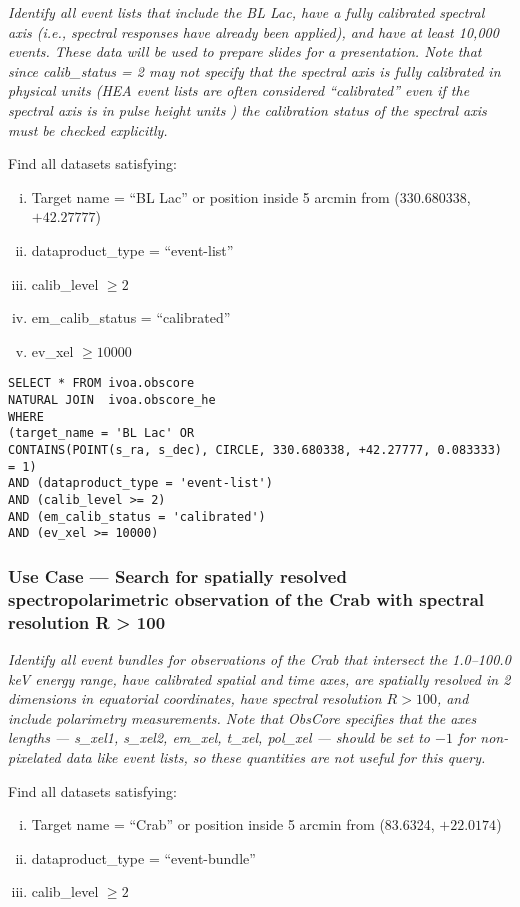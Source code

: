 {\em Identify all event lists that include the BL Lac, have a fully calibrated spectral axis (i.e., spectral responses have already been applied), and have at least 10,000 events.  These data will be used to prepare slides for a presentation.  Note that since calib\_status = 2 may not specify that the spectral axis is fully calibrated in physical units (HEA event lists are often considered ``calibrated'' even if the spectral axis is in pulse height units ) the calibration status of the spectral axis must be checked explicitly.\/}

\medskip
\noindent Find all datasets satisfying:
\begin{enumerate}[(i)]
  \item Target name = ``BL Lac'' or position inside 5 arcmin from (330.680338, $+42.27777$)
  \item dataproduct\_type = ``event-list''
  \item calib\_level $\geq 2$
  \item em\_calib\_status = ``calibrated''
  \item ev\_xel $\geq 10000$
\end{enumerate}

\begin{verbatim}
SELECT * FROM ivoa.obscore
NATURAL JOIN  ivoa.obscore_he 
WHERE
(target_name = 'BL Lac' OR
CONTAINS(POINT(s_ra, s_dec), CIRCLE, 330.680338, +42.27777, 0.083333) = 1) 
AND (dataproduct_type = 'event-list')
AND (calib_level >= 2)
AND (em_calib_status = 'calibrated')
AND (ev_xel >= 10000)
\end{verbatim}


\subsubsection{Use Case --- Search for spatially resolved spectropolarimetric observation of the Crab with spectral resolution R > 100}

{\em Identify all event bundles for observations of the Crab that intersect the 1.0--100.0 keV energy range, have calibrated spatial and time axes, are spatially resolved in 2 dimensions in equatorial coordinates, have spectral resolution $R>100$, and include polarimetry measurements.  Note that ObsCore specifies that the axes lengths --- s\_xel1, s\_xel2, em\_xel, t\_xel, pol\_xel --- should be set to $-1$ for non-pixelated data like event lists, so these quantities are not useful for this query.\/}

\medskip
\noindent Find all datasets satisfying:
\begin{enumerate}[(i)]
  \item Target name = ``Crab'' or position inside 5 arcmin from (83.6324, $+22.0174$)
  \item dataproduct\_type = ``event-bundle''
  \item calib\_level $\geq 2$
\end{enumerate}


